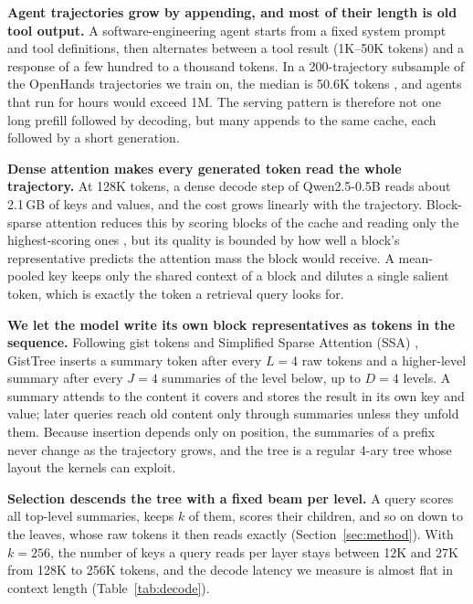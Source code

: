 \documentclass[10pt,twocolumn]{article}
\newcommand{\ours}{GistTree\xspace}
\newcommand{\para}[1]{\noindent\textbf{#1}\hspace{0.5em}}
\begin{document}

\para{Agent trajectories grow by appending, and most of their length is old tool output.}
A software-engineering agent starts from a fixed system prompt and tool definitions, then
alternates between a tool result (1K--50K tokens) and a response of a few hundred to a
thousand tokens. In a 200-trajectory subsample of the OpenHands trajectories we train on, the median is 50.6K tokens
\citep{badertdinov2025swerebench}, and agents that run for hours would exceed 1M. The serving
pattern is therefore not one long prefill followed by decoding, but many appends to the same
cache, each followed by a short generation.

\para{Dense attention makes every generated token read the whole trajectory.}
At 128K tokens, a dense decode step of Qwen2.5-0.5B reads about 2.1\,GB of keys and values,
and the cost grows linearly with the trajectory. Block-sparse attention reduces this by
scoring blocks of the cache and reading only the highest-scoring ones
\citep{tang2024quest,lu2025moba,yuan2025nsa}, but its quality is bounded by how well a block's
representative predicts the attention mass the block would receive. A mean-pooled key keeps
only the shared context of a block and dilutes a single salient token, which is exactly the
token a retrieval query looks for.

\para{We let the model write its own block representatives as tokens in the sequence.}
Following gist tokens \citep{mu2023gist} and Simplified Sparse Attention (SSA)
\citep{mao2026ssa}, \ours inserts a summary token after every $L=4$ raw tokens and a
higher-level summary after every $J=4$ summaries of the level below, up to $D=4$ levels.
A summary attends to the content it covers and stores the result in its own key and value;
later queries reach old content only through summaries unless they unfold them. Because
insertion depends only on position, the summaries of a prefix never change as the trajectory
grows, and the tree is a regular 4-ary tree whose layout the kernels can exploit.

\para{Selection descends the tree with a fixed beam per level.}
A query scores all top-level summaries, keeps $k$ of them, scores their children, and so on
down to the leaves, whose raw tokens it then reads exactly (Section~\ref{sec:method}). With
$k=256$, the number of keys a query reads per layer stays between 12K and 27K from 128K to
256K tokens, and the decode latency we measure is almost flat in context length
(Table~\ref{tab:decode}).
\end{document}
